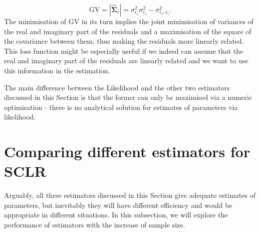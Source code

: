 \documentclass[
]{book}
\begin{document}
\begin{equation}
    \mathrm{GV} = |\hat{\boldsymbol{\Sigma}}_\epsilon| = \sigma_{\epsilon_r}^2 \sigma_{\epsilon_i}^2 - \sigma_{\epsilon_r, \epsilon_i}^2 .
    \label{eq:additiveLogLikConcentratedGV}
\end{equation}
The minimisation of GV in its turn implies the joint minimisation of variances of the real and imaginary part of the residuals and a maximisation of the square of the covariance between them, thus making the residuals more linearly related. This loss function might be especially useful if we indeed can assume that the real and imaginary part of the residuals are linearly related and we want to use this information in the estimation.

The main difference between the Likelihood and the other two estimators discussed in this Section is that the former can only be maximised via a numeric optimisation - there is no analytical solution for estimates of parameters via likelihood.

\hypertarget{SCLREstimatorsComparison}{%
\section{Comparing different estimators for SCLR}\label{SCLREstimatorsComparison}}

Arguably, all three estimators discussed in this Section give adequate estimates of parameters, but inevitably they will have different efficiency and would be appropriate in different situations. In this subsection, we will explore the performance of estimators with the increase of sample size.
\end{document}
